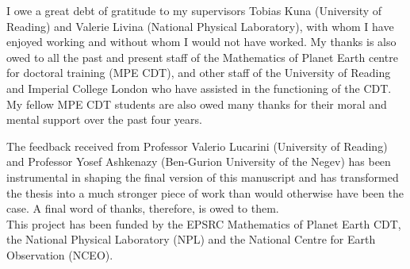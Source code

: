 
\begin{acknowledgements}      


I owe a great debt of gratitude to my supervisors Tobias Kuna (University of Reading) and Valerie Livina (National Physical Laboratory), with whom I have enjoyed working and without whom I would not have worked. My thanks is also owed to all the past and present staff of the Mathematics of Planet Earth centre for doctoral training (MPE CDT), and other staff of the University of Reading and Imperial College London who have assisted in the functioning of the CDT. My fellow MPE CDT students are also owed many thanks for their moral and mental support over the past four years.

The feedback received from Professor Valerio Lucarini (University of Reading) and Professor Yosef Ashkenazy (Ben-Gurion University of the Negev) has been instrumental in shaping the final version of this manuscript and has transformed the thesis into a much stronger piece of work than would otherwise have been the case. A final word of thanks, therefore, is owed to them.\\



This project has been funded by the EPSRC Mathematics of Planet Earth CDT, the National Physical Laboratory (NPL) and the National Centre for Earth Observation (NCEO).

\end{acknowledgements}